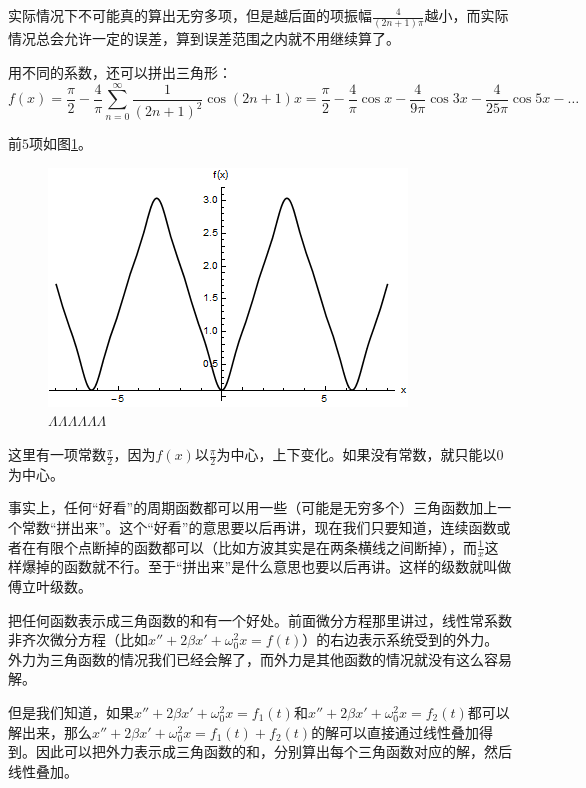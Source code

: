 实际情况下不可能真的算出无穷多项，但是越后面的项振幅$\frac{4}{(2 n+1) \pi}$越小，而实际情况总会允许一定的误差，算到误差范围之内就不用继续算了。

用不同的系数，还可以拼出三角形：
\begin{equation*}
f(x)=\frac{\pi}{2}-\frac{4}{\pi} \sum_{n=0}^{\infty} \frac{1}{(2 n+1)^2} \cos (2 n+1) x=\frac{\pi}{2}-\frac{4}{\pi} \cos x-\frac{4}{9 \pi} \cos 3 x-\frac{4}{25 \pi} \cos 5 x-\dots
\end{equation*}

前$5$项如图\ref{fig-trigo-triangle-wave}。
\begin{figure}[htb]
\centering
\includegraphics[scale=0.5]{fig/trigo-triangle-wave}
\caption{$\Lambda\Lambda\Lambda\Lambda\Lambda\Lambda$}
\label{fig-trigo-triangle-wave}
\end{figure}

这里有一项常数$\frac{\pi}{2}$，因为$f(x)$以$\frac{\pi}{2}$为中心，上下变化。如果没有常数，就只能以$0$为中心。

事实上，任何“好看”的周期函数都可以用一些（可能是无穷多个）三角函数加上一个常数“拼出来”。这个“好看”的意思要以后再讲，现在我们只要知道，连续函数或者在有限个点断掉的函数都可以（比如方波其实是在两条横线之间断掉），而$\frac{1}{x}$这样爆掉的函数就不行。至于“拼出来”是什么意思也要以后再讲。这样的级数就叫做傅立叶级数。

把任何函数表示成三角函数的和有一个好处。前面微分方程那里讲过，线性常系数非齐次微分方程（比如$x''+2 \beta x'+\omega_0^2 x=f(t)$）的右边表示系统受到的外力。外力为三角函数的情况我们已经会解了，而外力是其他函数的情况就没有这么容易解。

但是我们知道，如果$x''+2 \beta x'+\omega_0^2 x=f_1(t)$和$x''+2 \beta x'+\omega_0^2 x=f_2(t)$都可以解出来，那么$x''+2 \beta x'+\omega_0^2 x=f_1(t)+f_2(t)$的解可以直接通过线性叠加得到。因此可以把外力表示成三角函数的和，分别算出每个三角函数对应的解，然后线性叠加。

